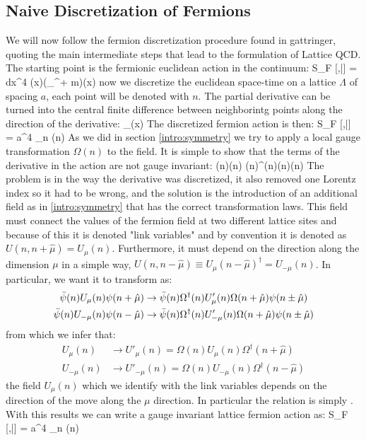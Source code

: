 \subsection{Naive Discretization of Fermions}
We will now follow the fermion discretization procedure found in \CIT gattringer, quoting the main intermediate steps that lead to the formulation of Lattice QCD. The starting point is the fermionic euclidean action in the continuum:
\beq
    S_F [\psi,\bar\psi] = \int dx^4 \bpsi(x)(\gamma_\mu\partial^\mu + m)\psi(x)
\eeq 
now we discretize the euclidean space-time on a lattice $\Lambda$ of spacing $a$, each point will be denoted with $n$. The partial derivative can be turned into the central finite difference between neighborintg points along the direction of the derivative:
\beq
    \partial_\mu\psi(x) \rightarrow {}
\eeq 
The discretized fermion action is then:
\beq
    S_F [\psi,\bar\psi] = a^4 \sum_{n\in\Lambda} \bpsi(n) \left[ \sum_{\mu=1}^4\gamma_\mu  \frac{\psi(n+\hat\mu) - \psi(n-\hat\mu)}{2a} + m \psi(n) \right]
\eeq 
As we did in section \ref{intro:symmetry} we try to apply a local gauge transformation $\Omega(n)$ to the field. It is simple to show that the terms of the derivative in the action are not gauge invariant:
\beq
    \bpsi(n)\psi(n\pm\hat\mu) \rightarrow \bpsi(n)\Omega^\dagger(n)\Omega(n\pm\hat\mu)\psi(n\pm\hat\mu)
\eeq
The problem is in the way the derivative was discretized, it also removed one Lorentz index so it had to be wrong, and the solution is the introduction of an additional field as in \ref{intro:symmetry} that has the correct transformation laws. This field must connect the values of the fermion field at two different lattice sites and because of this it is denoted "link variables" and by convention it is denoted as $U(n, n + \hat\mu) = U_\mu(n)$. Furthermore, it must depend on the direction along the dimension $\mu$ in a simple way, $U(n, n-\hat\mu) \equiv U_\mu(n-\hat\mu)^\dagger = U_{-\mu}(n)$. In particular, we want it to transform as:
\begin{align}
    \bar{\psi}(n)U_\mu(n)\psi(n+\hat\mu) &\rightarrow \bar{\psi}(n)\Omega^\dagger(n)U'_\mu(n)\Omega(n+\hat\mu)\psi(n\pm\hat\mu)\\\nonumber
    \bar{\psi}(n)U_{-\mu}(n)\psi(n-\hat\mu) &\rightarrow \bar{\psi}(n)\Omega^\dagger(n)U'_{-\mu}(n)\Omega(n+\hat\mu)\psi(n\pm\hat\mu)
\end{align}
from which we infer that:
\begin{align}
    U_\mu(n)    &\rightarrow U'_\mu(n) = \Omega(n)U_\mu(n)\Omega^\dagger(n+\hat\mu)\label{link_transformation}\\\nonumber
    U_{-\mu}(n) &\rightarrow U'_{-\mu}(n) = \Omega(n)U_{-\mu}(n)\Omega^\dagger(n-\hat\mu)
\end{align}
the field $U_\mu(n)$ which we identify with the link variables depends on the direction of the move along the $\mu$ direction. In particular the relation is simply .  With this results we can write a gauge invariant lattice fermion action as:
\beq
    S_F [\psi,\bar\psi] = a^4 \sum_{n\in\Lambda} \bpsi(n) \left[ \sum_{\mu=1}^4\gamma_\mu  \frac{U_\mu(n)\psi(n+\hat\mu) - U_{-\mu}(n)\psi(n-\hat\mu)}{2a} + m \psi(n) \right]
    \label{intro:lat_action}
\eeq

